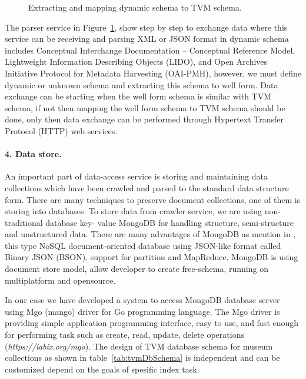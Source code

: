 \begin{figure}[ht]
	\caption{Extracting and mapping dynamic schema to TVM schema.}\label{fig:tvmMapping}
\end{figure}

The parser service in Figure~\cref{fig:tvmMapping}, show step by step to exchange data where this service can be receiving and parsing XML or JSON format in dynamic schema includes Conceptual Interchange Documentation -- Conceptual Reference Model, Lightweight Information Describing Objects (LIDO), and Open Archives Initiative Protocol for Metadata Harvesting (OAI-PMH), however, we must define dynamic or unknown schema and extracting this schema to well form. Data exchange can be starting when the well form schema is similar with TVM schema, if not then mapping the well form schema to TVM schema should be done, only then data exchange can be performed through Hypertext Transfer Protocol (HTTP) web services.

\paragraph{4. Data store.} An important part of data-access service is storing and maintaining data collections which have been crawled and parsed to the standard data structure form. There are many techniques to preserve document collections, one of them is storing into databases. To store data from crawler service, we are using non-traditional database key- value MongoDB for handling structure, semi-structure and unstructured data. There are many advantages of MongoDB as mention in \cite{StanescuBrezovanBurdescu,JiaZhaoWang,WuChenJiang}, this type NoSQL document-oriented database using JSON-like format called Binary JSON (BSON), support for partition and MapReduce. MongoDB is using document store model, allow developer to create free-schema, running on multiplatform and opensource.

In our case we have developed a system to access MongoDB database server using Mgo (mango) driver for Go programming language. The Mgo driver is providing simple application programming interface, easy to use, and fast enough for performing task such as create, read, update, delete operations (\textit{https://labix.org/mgo}). The design of TVM database schema for museum collections \cite{AnggaiBlekanovSergeev2015} as shown in table~\cref{tab:tvmDbSchema} is independent and can be customized depend on the goals of spesific index task.

